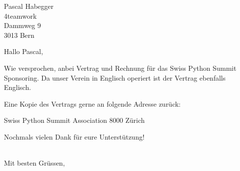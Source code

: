 \documentclass[SN,11pt,enlargefirstpage=true,sps]{scrlttr2}
\begin{document}
\begin{letter}{Pascal Habegger\\4teamwork\\Dammweg 9\\3013 Bern}

  \opening{Hallo Pascal,}

    Wie versprochen, anbei Vertrag und Rechnung für das Swiss Python Summit
    Sponsoring. Da unser Verein in Englisch operiert ist der Vertrag ebenfalls
    Englisch.

    Eine Kopie des Vertrags gerne an folgende Adresse zurück:

    Swiss Python Summit Association
    8000 Zürich

    Nochmals vielen Dank für eure Unterstützung!

  \closing{\\Mit besten Grüssen,}

\end{letter}
\end{document}
